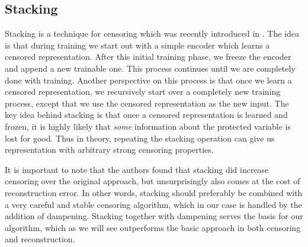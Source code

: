 \documentclass[nohyperref]{article}
\theoremstyle{plain}
\theoremstyle{definition}
\theoremstyle{remark}
\begin{document}
\subsection{Stacking}
Stacking is a technique for censoring which was recently introduced in \cite{kenfack2021adversarial}. The idea is that during training we start out with a simple encoder which learns a censored representation. After this initial training phase, we freeze the encoder and append a new trainable one. This process continues until we are completely done with training. Another perspective on this process is that once we learn a censored representation, we recursively start over a completely new training process, except that we use the censored representation as the new input. The key idea behind stacking is that once a censored representation is learned and frozen, it is highly likely that \emph{some} information about the protected variable is lost for good. Thus in theory, repeating the stacking operation can give us representation with arbitrary strong censoring properties.

It is important to note that the authors found that stacking did increase censoring over the original approach, but unsurprisingly also comes at the cost of reconstruction error. In other words, stacking should preferably be combined with a very careful and stable censoring algorithm, which in our case is handled by the addition of dampening. Stacking together with dampening serves the basis for our algorithm, which as we will see outperforms the basic approach in both censoring and reconstruction.
\end{document}
